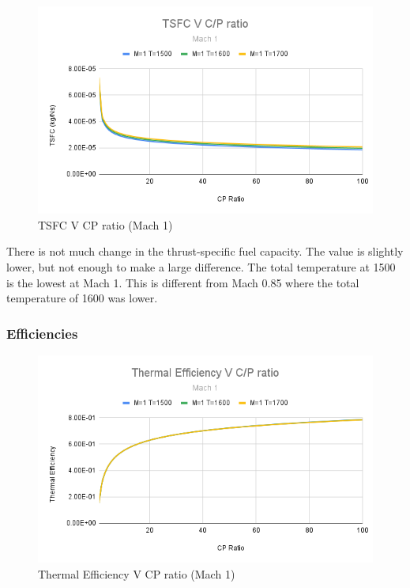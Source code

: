 \documentclass[12pt]{report}
\begin{document}
\begin{figure}[H]
    \centering
    \includegraphics[width=15.5 cm]{TSFC V C_P ratio (Mach 0.1).png}
    \caption{TSFC V CP ratio (Mach 1)}
    \label{fig:TSFC V C_P ratio (Mach 1)}
\end{figure}



There is not much change in the thrust-specific fuel capacity. The value is slightly lower, but not enough to make a large difference. The total temperature at 1500 is the lowest at Mach 1. This is different from Mach 0.85 where the total temperature of 1600 was lower. 

\subsubsection{Efficiencies}


\begin{figure}[H]
    \centering
    \includegraphics[width=15.5 cm]{Thermal Efficiency V C_P ratio (Mach 0.1).png}
    \caption{Thermal Efficiency V CP ratio (Mach 1)}
    \label{fig:Thermal Efficiency V CP ratio (Mach 1)}
\end{figure}
\end{document}
